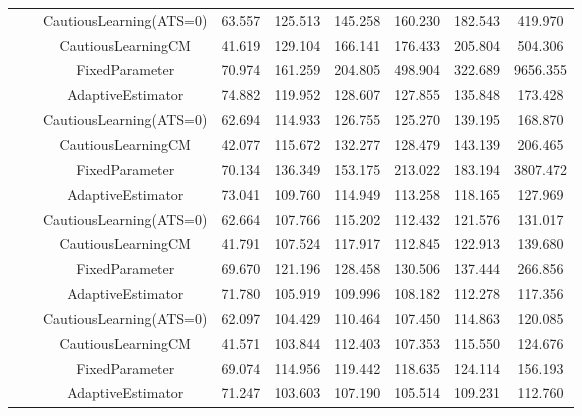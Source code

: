 \begin{table}[!h]
\begin{tabular}[t]{ccccccccc}
 &  & CautiousLearning(ATS=0) & 63.557 & 125.513 & 145.258 & 160.230 & 182.543 & 419.970\\

 &  & CautiousLearningCM & 41.619 & 129.104 & 166.141 & 176.433 & 205.804 & 504.306\\

 & \multirow[t]{-4}{*}{\centering\arraybackslash 0.35} & FixedParameter & 70.974 & 161.259 & 204.805 & 498.904 & 322.689 & 9656.355\\
\cmidrule{2-9}
 &  & AdaptiveEstimator & 74.882 & 119.952 & 128.607 & 127.855 & 135.848 & 173.428\\

 &  & CautiousLearning(ATS=0) & 62.694 & 114.933 & 126.755 & 125.270 & 139.195 & 168.870\\

 &  & CautiousLearningCM & 42.077 & 115.672 & 132.277 & 128.479 & 143.139 & 206.465\\

 & \multirow[t]{-4}{*}{\centering\arraybackslash 0.50} & FixedParameter & 70.134 & 136.349 & 153.175 & 213.022 & 183.194 & 3807.472\\
\cmidrule{2-9}
 &  & AdaptiveEstimator & 73.041 & 109.760 & 114.949 & 113.258 & 118.165 & 127.969\\

 &  & CautiousLearning(ATS=0) & 62.664 & 107.766 & 115.202 & 112.432 & 121.576 & 131.017\\

 &  & CautiousLearningCM & 41.791 & 107.524 & 117.917 & 112.845 & 122.913 & 139.680\\

 & \multirow[t]{-4}{*}{\centering\arraybackslash 0.75} & FixedParameter & 69.670 & 121.196 & 128.458 & 130.506 & 137.444 & 266.856\\
\cmidrule{2-9}
 &  & AdaptiveEstimator & 71.780 & 105.919 & 109.996 & 108.182 & 112.278 & 117.356\\

 &  & CautiousLearning(ATS=0) & 62.097 & 104.429 & 110.464 & 107.450 & 114.863 & 120.085\\

 &  & CautiousLearningCM & 41.571 & 103.844 & 112.403 & 107.353 & 115.550 & 124.676\\

 & \multirow[t]{-4}{*}{\centering\arraybackslash 1.00} & FixedParameter & 69.074 & 114.956 & 119.442 & 118.635 & 124.114 & 156.193\\
\cmidrule{2-9}
 &  & AdaptiveEstimator & 71.247 & 103.603 & 107.190 & 105.514 & 109.231 & 112.760\\


\end{tabular}
\end{table}
